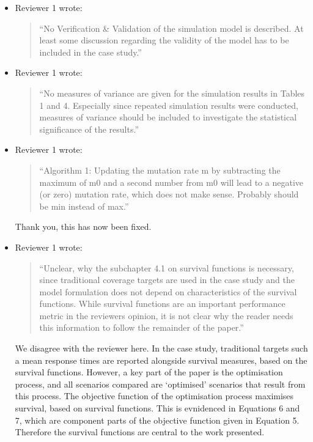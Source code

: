 \documentclass{article}
\begin{document}
\begin{itemize}

\item Reviewer 1 wrote:
\begin{quote}
``No Verification \& Validation of the simulation model is described. At least some discussion regarding the validity of the model has to be included in the case study.''
\end{quote}

\item Reviewer 1 wrote:
\begin{quote}
``No measures of variance are given for the simulation results in Tables 1 and 4. Especially since repeated simulation results were conducted, measures of variance should be included to investigate the statistical significance of the results.''
\end{quote}

\item Reviewer 1 wrote:
\begin{quote}
``Algorithm 1: Updating the mutation rate m by subtracting the maximum of m0 and a second number from m0 will lead to a negative (or zero) mutation rate, which does not make sense. Probably should be min instead of max.''
\end{quote}
Thank you, this has now been fixed.

\item Reviewer 1 wrote:
\begin{quote}
``Unclear, why the subchapter 4.1 on survival functions is necessary, since traditional coverage targets are used in the case study and the model formulation does not depend on characteristics of the survival functions. While survival functions are an important performance metric in the reviewers opinion, it is not clear why the reader needs this information to follow the remainder of the paper.''
\end{quote}
We disagree with the reviewer here. In the case study, traditional targets such a mean response times are reported alongside survival measures, based on the survival functions. However, a key part of the paper is the optimisation process, and all scenarios compared are `optimised' scenarios that result from this process. The objective function of the optimisation process maximises survival, based on survival functions. This is evnidenced in Equations 6 and 7, which are component parts of the objective function given in Equation 5. Therefore the survival functions are central to the work presented.


\end{itemize}
\end{document}
